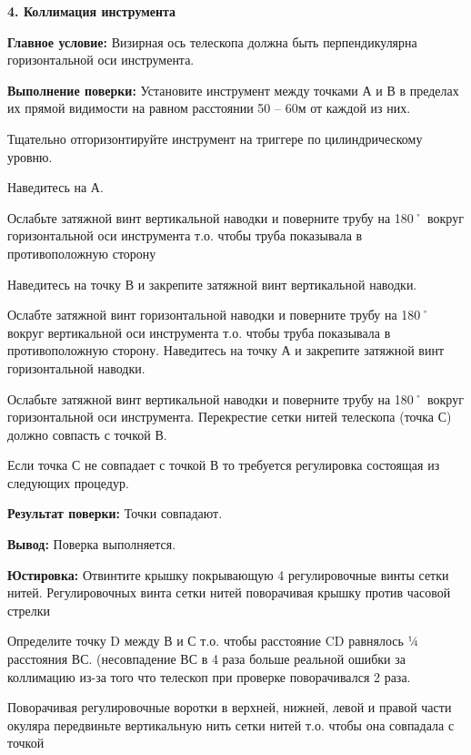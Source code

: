 \documentclass[a4paper]{article}
\begin{document}
{\par\textbf{4. Коллимация инструмента}
\par \textbf{Главное условие:} Визирная ось телескопа должна быть перпендикулярна горизонтальной оси инструмента.
\par \textbf{Выполнение поверки:} Установите инструмент между точками А и В в пределах их прямой видимости на равном расстоянии 50 – 60м от каждой из них.
\par Тщательно отгоризонтируйте инструмент на триггере по цилиндрическому уровню.
\par Наведитесь на А.
\par Ослабьте затяжной винт вертикальной наводки и поверните трубу на 180˚ вокруг горизонтальной оси инструмента т.о. чтобы труба показывала в
противоположную сторону
\par Наведитесь на точку В и закрепите затяжной винт вертикальной наводки.
\par Ослабте затяжной винт горизонтальной наводки и поверните трубу на 180˚ вокруг вертикальной оси инструмента т.о. чтобы труба показывала в
противоположную сторону. Наведитесь на точку А и закрепите затяжной винт
горизонтальной наводки.
\par Ослабьте затяжной винт вертикальной наводки и поверните трубу на 180˚
вокруг горизонтальной оси инструмента. Перекрестие сетки нитей телескопа (точка С)
должно совпасть с точкой В.
\par Если точка С не совпадает с точкой В то требуется регулировка состоящая из
следующих процедур.
\par \textbf{Результат поверки:} Точки совпадают.
\par\textbf{Вывод:} Поверка выполняется.
\par \textbf{Юстировка:} Отвинтите крышку покрывающую 4 регулировочные винты сетки нитей. Регулировочных винта сетки нитей поворачивая крышку против часовой стрелки
\par Определите точку D между В и С т.о. чтобы расстояние CD равнялось ¼ расстояния ВС. (несовпадение ВС в 4 раза больше реальной ошибки за коллимацию из-за того что телескоп при проверке поворачивался 2 раза.
\par Поворачивая регулировочные воротки в верхней, нижней, левой и правой части
окуляра передвиньте вертикальную нить сетки нитей т.о. чтобы она совпадала с точкой
}
\end{document}
